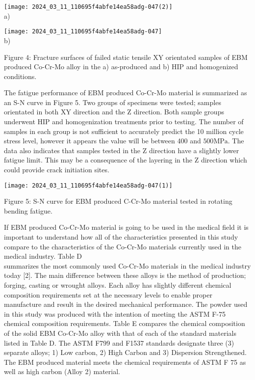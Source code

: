\documentclass[10pt]{article}
\begin{document}
\texttt{[image: 2024\_03\_11\_110695f4abfe14ea58adg-047(2)]}\\
a)

\texttt{[image: 2024\_03\_11\_110695f4abfe14ea58adg-047]}\\
b)

Figure 4: Fracture surfaces of failed static tensile XY orientated samples of EBM produced Co-Cr-Mo alloy in the a) as-produced and b) HIP and homogenized conditions.

The fatigue performance of EBM produced Co-Cr-Mo material is summarized as an S-N curve in Figure 5. Two groups of specimens were tested; samples orientated in both XY direction and the $\mathrm{Z}$ direction. Both sample groups underwent HIP and homogenization treatments prior to testing. The number of samples in each group is not sufficient to accurately predict the 10 million cycle stress level, however it appears the value will be between 400 and $500 \mathrm{MPa}$. The data also indicates that samples tested in the $\mathrm{Z}$ direction have a slightly lower fatigue limit. This may be a consequence of the layering in the $\mathrm{Z}$ direction which could provide crack initiation sites.

\begin{center}
\texttt{[image: 2024\_03\_11\_110695f4abfe14ea58adg-047(1)]}
\end{center}

Figure 5: S-N curve for EBM produced C-Cr-Mo material tested in rotating bending fatigue.

If EBM produced Co-Cr-Mo material is going to be used in the medical field it is important to understand how all of the characteristics presented in this study compare to the characteristics of the Co-Cr-Mo materials currently used in the medical industry. Table D\\
summarizes the most commonly used Co-Cr-Mo materials in the medical industry today [2]. The main difference between these alloys is the method of production; forging, casting or wrought alloys. Each alloy has slightly different chemical composition requirements set at the necessary levels to enable proper manufacture and result in the desired mechanical performance. The powder used in this study was produced with the intention of meeting the ASTM F-75 chemical composition requirements. Table E compares the chemical composition of the solid EBM Co-Cr-Mo alloy with that of each of the standard materials listed in Table D. The ASTM F799 and F1537 standards designate three (3) separate alloys; 1) Low carbon, 2) High Carbon and 3) Dispersion Strengthened. The EBM produced material meets the chemical requirements of ASTM F 75 as well as high carbon (Alloy 2) material.
\end{document}
